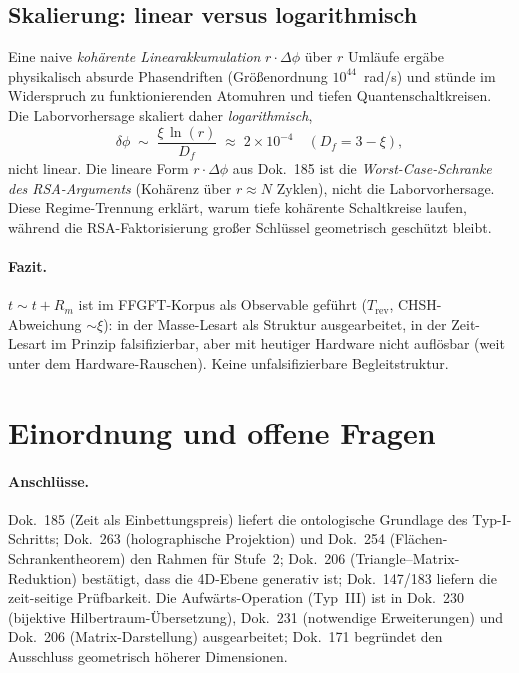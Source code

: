 \subsection{Skalierung: linear versus logarithmisch}

\begin{important}
Eine naive \emph{koh\"arente Linearakkumulation} $r\cdot\Delta\phi$ \"uber $r$
Uml\"aufe erg\"abe physikalisch absurde Phasendriften (Gr\"o\ss enordnung
$10^{44}$~rad/s) und st\"unde im Widerspruch zu funktionierenden Atomuhren und
tiefen Quantenschaltkreisen. Die Laborvorhersage skaliert daher
\emph{logarithmisch},
\[
  \delta\phi \;\sim\; \frac{\xi\,\ln(r)}{D_f}
  \;\approx\; 2\times10^{-4} \quad (D_f = 3-\xi),
\]
nicht linear. Die lineare Form $r\cdot\Delta\phi$ aus Dok.~185 ist die
\emph{Worst-Case-Schranke des RSA-Arguments} (Koh\"arenz \"uber $r\approx N$
Zyklen), nicht die Laborvorhersage. Diese Regime-Trennung erkl\"art, warum tiefe
koh\"arente Schaltkreise laufen, w\"ahrend die RSA-Faktorisierung gro\ss er
Schl\"ussel geometrisch gesch\"utzt bleibt.
\end{important}

\paragraph{Fazit.}
$t\sim t+R_m$ ist im FFGFT-Korpus als Observable gef\"uhrt ($T_\text{rev}$,
CHSH-Abweichung $\sim\xi$): in der Masse-Lesart als Struktur ausgearbeitet, in der
Zeit-Lesart im Prinzip falsifizierbar, aber mit heutiger Hardware nicht aufl\"osbar (weit unter dem Hardware-Rauschen). Keine unfalsifizierbare Begleitstruktur.

\section{Einordnung und offene Fragen}\label{sec:offen}

\paragraph{Anschl\"usse.}
Dok.~185 (Zeit als Einbettungspreis) liefert die ontologische Grundlage des
Typ-I-Schritts; Dok.~263 (holographische Projektion) und Dok.~254
(Fl\"achen-Schrankentheorem) den Rahmen f\"ur Stufe~2; Dok.~206
(Triangle--Matrix-Reduktion) best\"atigt, dass die 4D-Ebene generativ ist;
Dok.~147/183 liefern die zeit-seitige Pr\"ufbarkeit. Die Aufw\"arts-Operation
(Typ~III) ist in Dok.~230 (bijektive Hilbertraum-\"Ubersetzung), Dok.~231
(notwendige Erweiterungen) und Dok.~206 (Matrix-Darstellung) ausgearbeitet;
Dok.~171 begr\"undet den Ausschluss geometrisch h\"oherer Dimensionen.

